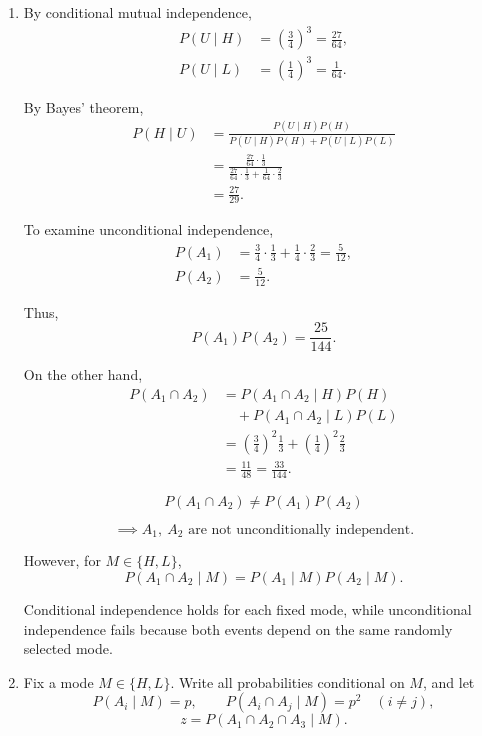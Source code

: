 \documentclass[11pt,a4paper]{article}
\newcommand{\Prob}{P}
\begin{document}
\begin{enumerate}

\item[(a)]
By conditional mutual independence,
\[
\begin{aligned}
\Prob(U\mid H)
&=\left(\frac34\right)^3=\frac{27}{64},\\
\Prob(U\mid L)
&=\left(\frac14\right)^3=\frac1{64}.
\end{aligned}
\]

By Bayes' theorem,
\[
\begin{aligned}
\Prob(H\mid U)
&=\frac{\Prob(U\mid H)\Prob(H)}
{\Prob(U\mid H)\Prob(H)+\Prob(U\mid L)\Prob(L)}\\
&=\frac{\frac{27}{64}\cdot\frac13}
{\frac{27}{64}\cdot\frac13+\frac1{64}\cdot\frac23}\\
&=\frac{27}{29}.
\end{aligned}
\]

To examine unconditional independence,
\[
\begin{aligned}
\Prob(A_1)
&=\frac34\cdot\frac13+\frac14\cdot\frac23
=\frac5{12},\\
\Prob(A_2)&=\frac5{12}.
\end{aligned}
\]

Thus,
\[
\Prob(A_1)\Prob(A_2)=\frac{25}{144}.
\]

On the other hand,
\[
\begin{aligned}
\Prob(A_1\cap A_2)
&=\Prob(A_1\cap A_2\mid H)\Prob(H)\\
&\quad+\Prob(A_1\cap A_2\mid L)\Prob(L)\\
&=\left(\frac34\right)^2\frac13
+\left(\frac14\right)^2\frac23\\
&=\frac{11}{48}
=\frac{33}{144}.
\end{aligned}
\]

\[
\Prob(A_1\cap A_2)\ne\Prob(A_1)\Prob(A_2)
\]

\[
\implies A_1,\ A_2
\text{ are not unconditionally independent.}
\]

However, for $M\in\{H,L\}$,
\[
\Prob(A_1\cap A_2\mid M)
=\Prob(A_1\mid M)\Prob(A_2\mid M).
\]

Conditional independence holds for each fixed mode,
while unconditional independence fails because both
events depend on the same randomly selected mode.

\item[(b)]
Fix a mode $M\in\{H,L\}$.
Write all probabilities conditional on $M$, and let
\[
\Prob(A_i\mid M)=p,\qquad
\Prob(A_i\cap A_j\mid M)=p^2
\quad(i\ne j),
\]
\[
z=\Prob(A_1\cap A_2\cap A_3\mid M).
\]


\end{enumerate}
\end{document}
